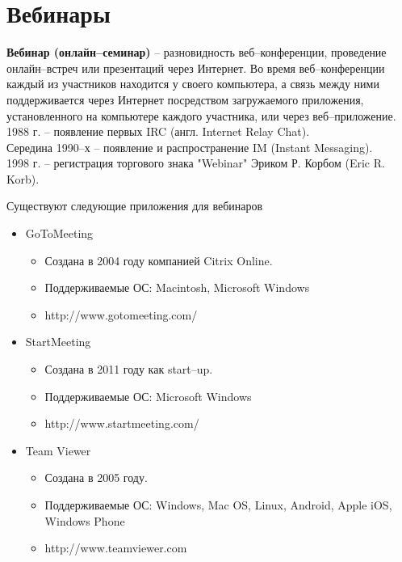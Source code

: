 \section{Вебинары}
\textbf{Вебинар (онлайн--семинар)} -- разновидность веб--конференции, проведение онлайн--встреч или презентаций через Интернет. Во время веб--конференции каждый из участников находится у своего компьютера, а связь между ними поддерживается через Интернет посредством загружаемого приложения, установленного на компьютере каждого участника, или через веб--приложение.
\\1988 г. – появление первых IRC (англ. Internet Relay Chat).
\\Середина 1990--х – появление и распространение IM (Instant Messaging).
\\1998 г. – регистрация торгового знака "Webinar" Эриком Р. Корбом (Eric R. Korb).
\begin{center}
  Существуют следующие приложения для вебинаров
\end{center}
\begin{itemize}
  \item GoToMeeting
    \begin{itemize}
    \item Создана в 2004 году компанией Citrix Online.
    \item Поддерживаемые ОС: Macintosh, Microsoft Windows
    \item http://www.gotomeeting.com/
  \end{itemize}
  \item StartMeeting
    \begin{itemize}
    \item Создана в 2011 году как start--up.
    \item Поддерживаемые ОС: Microsoft Windows
    \item http://www.startmeeting.com/
  \end{itemize}
  \item Team Viewer
    \begin{itemize}
    \item Создана в 2005 году.
    \item Поддерживаемые ОС: Windows, Mac OS, Linux, Android, Apple iOS, Windows Phone
    \item http://www.teamviewer.com
  \end{itemize}
\end{itemize}